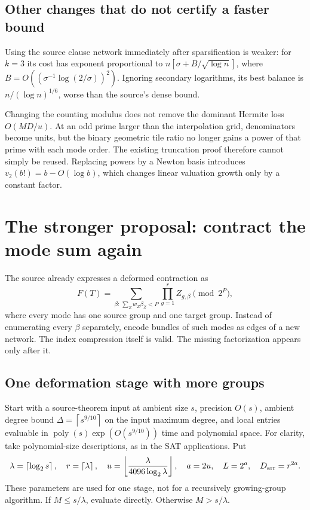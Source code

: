 \documentclass[11pt]{article}
\theoremstyle{definition}
\theoremstyle{remark}
\newcommand{\poly}{\operatorname{poly}}
\newcommand{\ceil}[1]{\left\lceil #1\right\rceil}
\newcommand{\floor}[1]{\left\lfloor #1\right\rfloor}
\begin{document}
\subsection{Other changes that do not certify a faster bound}
Using the source clause network immediately after sparsification is weaker:
for $k=3$ its cost has exponent proportional to
$n[\sigma+B/\sqrt{\log n}]$, where
$B=O((\sigma^{-1}\log(2/\sigma))^2)$. Ignoring secondary logarithms, its
best balance is $n/(\log n)^{1/6}$, worse than the source's dense bound.

Changing the counting modulus does not remove the dominant Hermite loss
$O(MD/u)$. At an odd prime larger than the interpolation grid, denominators
become units, but the binary geometric tile ratio no longer gains a power of
that prime with each mode order. The existing truncation proof therefore
cannot simply be reused. Replacing powers by a Newton basis introduces
$v_2(b!)=b-O(\log b)$, which changes linear valuation growth only by a
constant factor.

\section{The stronger proposal: contract the mode sum again}\label{sec:conditional}

The source already expresses a deformed contraction as
\begin{equation}\label{eq:mode-sum}
 F(T)=\sum_{\beta:\,\sum_Zw_Z\beta_Z<P}
                         \prod_{g=1}^r Z_{g,\beta}\pmod{2^P},
\end{equation}
where every mode has one source group and one target group. Instead of
enumerating every $\beta$ separately, encode bundles of such modes as edges
of a new network. The index compression itself is valid. The missing
factorization appears only after it.

\subsection{One deformation stage with more groups}
Start with a source-theorem input at ambient size $s$, precision $O(s)$,
ambient degree bound $\Delta=\ceil{s^{9/10}}$ on the input maximum
degree, and local entries evaluable in
$\poly(s)\exp(O(s^{9/10}))$ time and polynomial space. For clarity, take
polynomial-size descriptions, as in the SAT applications. Put
\begin{equation}\label{eq:first-stage}
 \lambda=\ceil{\log_2s},\quad r=\ceil{\lambda},\quad
 u=\floor{\frac{\lambda}{4096\log_2\lambda}},\quad
 a=2u,\quad L=2^a,\quad D_{\rm arr}=r^{2a}.
\end{equation}
These parameters are used for one stage, not for a recursively growing-group
algorithm. If $M\le s/\lambda$, evaluate directly. Otherwise $M>s/\lambda$.
\end{document}
